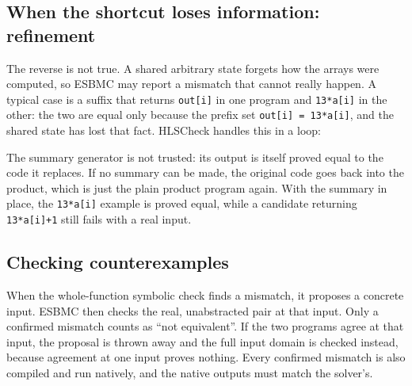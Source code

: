 \documentclass[10pt,a4paper]{article}
\begin{document}
\subsection{When the shortcut loses information: refinement}
The reverse is not true. A shared arbitrary state forgets how the arrays were computed, so ESBMC may
report a mismatch that cannot really happen. A typical case is a suffix that returns \texttt{out[i]}
in one program and \texttt{13*a[i]} in the other: the two are equal only because the prefix set
\texttt{out[i] = 13*a[i]}, and the shared state has lost that fact. HLSCheck handles this in a loop:
\begin{center}
\end{center}
The summary generator is not trusted: its output is itself proved equal to the code it replaces.
If no summary can be made, the original code goes back into the product, which is just the plain
product program again. With the summary in place, the \texttt{13*a[i]} example is proved equal,
while a candidate returning \texttt{13*a[i]+1} still fails with a real input.

\subsection{Checking counterexamples}
When the whole-function symbolic check finds a mismatch, it proposes a concrete input. ESBMC then
checks the real, unabstracted pair at that input. Only a confirmed mismatch counts as ``not
equivalent''. If the two programs agree at that input, the proposal is thrown away and the full
input domain is checked instead, because agreement at one input proves nothing. Every confirmed
mismatch is also compiled and run natively, and the native outputs must match the solver's.
\end{document}
